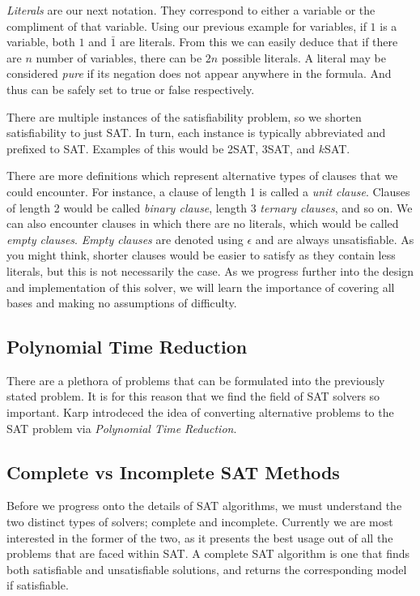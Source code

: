 \documentclass{article}
\begin{document}
\textit{Literals} are our next notation. They correspond to either a variable or the compliment of
that variable. Using our previous example for variables, if $1$ is a variable, both $1$ and
$\bar{1}$ are literals. From this we can easily deduce that if there are $n$ number of variables,
there can be $2n$ possible literals. A literal may be considered \textit{pure} if its negation does
not appear anywhere in the formula. And thus can be safely set to true or false respectively.

There are multiple instances of the satisfiability problem, so we shorten satisfiability to just
SAT. In turn, each instance is typically abbreviated and prefixed to SAT. Examples of this would
be 2SAT, 3SAT, and $k$SAT.

There are more definitions which represent alternative types of clauses that we could encounter. For  instance, a clause of 
length 1 is called a \textit{unit clause}. Clauses of length 2
would be called \textit{binary clause}, length 3 \textit{ternary clauses}, and so on. We can also
encounter clauses in which there are no literals, which would be called \textit{empty clauses}.
\textit{Empty clauses} are denoted using $\epsilon$ and are always unsatisfiable. As you might
think, shorter clauses would be easier to satisfy as they contain less literals, but this is not
necessarily the case. As we progress further into the design and implementation of this solver, we
will learn the importance of covering all bases and making no assumptions of difficulty.

\subsection{Polynomial Time Reduction}
There are a plethora of problems that can be formulated into the previously stated problem. It is
for this reason that we find the field of SAT solvers so important. Karp\cite{karp} introdeced the idea of converting alternative
problems to the SAT problem via \textit{Polynomial Time Reduction}.

\subsection{Complete vs Incomplete SAT Methods}
Before we progress onto the details of SAT algorithms, we must understand the two distinct types of
solvers; complete and incomplete. Currently we are most interested in the former of the two, as it
presents the best usage out of all the problems that are faced within SAT. A complete SAT algorithm
is one that finds both satisfiable and unsatisfiable solutions, and returns the corresponding model
if satisfiable.
\end{document}
